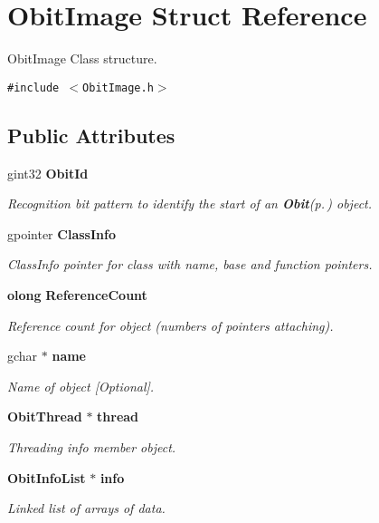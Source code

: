 \section{Obit\-Image Struct Reference}
\label{structObitImage}
Obit\-Image Class structure.  


{\tt \#include $<$Obit\-Image.h$>$}

\subsection*{Public Attributes}
\begin{CompactItemize}
\item 
gint32 {\bf Obit\-Id}
\begin{CompactList}\small\item\em Recognition bit pattern to identify the start of an {\bf Obit}{\rm (p.\,\pageref{structObit})} object. \item\end{CompactList}\item 
gpointer {\bf Class\-Info}
\begin{CompactList}\small\item\em Class\-Info pointer for class with name, base and function pointers. \item\end{CompactList}\item 
{\bf olong} {\bf Reference\-Count}
\begin{CompactList}\small\item\em Reference count for object (numbers of pointers attaching). \item\end{CompactList}\item 
gchar $\ast$ {\bf name}
\begin{CompactList}\small\item\em Name of object [Optional]. \item\end{CompactList}\item 
{\bf Obit\-Thread} $\ast$ {\bf thread}
\begin{CompactList}\small\item\em Threading info member object. \item\end{CompactList}\item 
{\bf Obit\-Info\-List} $\ast$ {\bf info}
\begin{CompactList}\small\item\em Linked list of arrays of data. \item\end{CompactList}\item 

\end{CompactItemize}
